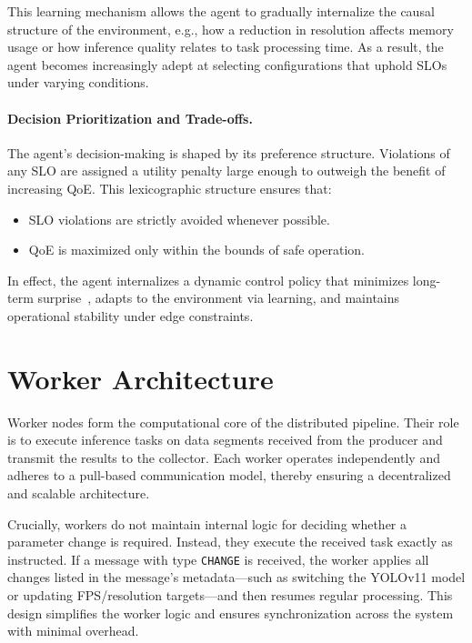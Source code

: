 This learning mechanism allows the agent to gradually internalize the causal structure of the environment, e.g., how a reduction in resolution affects memory usage or how inference quality relates to task processing time. As a result, the agent becomes increasingly adept at selecting configurations that uphold SLOs under varying conditions.

\paragraph{Decision Prioritization and Trade-offs.}
The agent’s decision-making is shaped by its preference structure. Violations of any SLO are assigned a utility penalty large enough to outweigh the benefit of increasing QoE. This lexicographic structure ensures that:
\begin{itemize}
  \item SLO violations are strictly avoided whenever possible.
  \item QoE is maximized only within the bounds of safe operation.
\end{itemize}

In effect, the agent internalizes a dynamic control policy that minimizes long-term surprise~\cite{sedlak_adaptive_2024}, adapts to the environment via learning, and maintains operational stability under edge constraints.


\section{Worker Architecture}
\label{sec:evaluation-implementation-worker-architecture}
Worker nodes form the computational core of the distributed pipeline. Their role is to execute inference tasks on data segments received from the producer and transmit the results to the collector. Each worker operates independently and adheres to a pull-based communication model, thereby ensuring a decentralized and scalable architecture.

Crucially, workers do not maintain internal logic for deciding whether a parameter change is required. Instead, they execute the received task exactly as instructed. If a message with type \texttt{CHANGE} is received, the worker applies all changes listed in the message's metadata—such as switching the YOLOv11 model or updating FPS/resolution targets—and then resumes regular processing. This design simplifies the worker logic and ensures synchronization across the system with minimal overhead.

